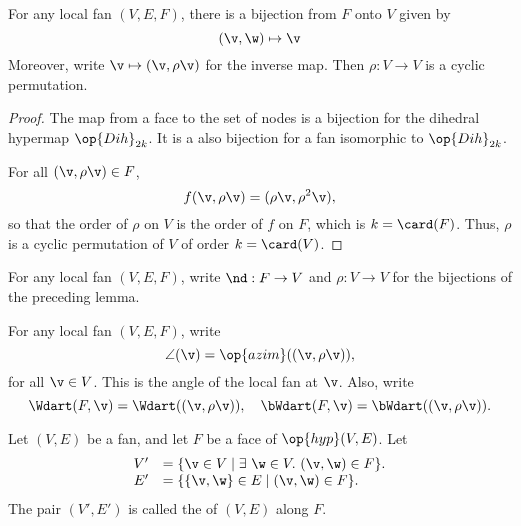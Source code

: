 
\begin{lemma}[]  
For any local fan $(V,E,F)$, there is a bijection from $F$ onto $V$
given by
\begin{displaymath}
(\v,\w) \mapsto \v
\end{displaymath}
Moreover, write $\v\mapsto(\v,\rho\v)$ for the inverse map. 
Then $\rho:V\to V$ is a cyclic permutation.
\end{lemma}
%

\begin{proof} The map from a face to the set of nodes is a bijection
for the dihedral hypermap $\op{Dih}_{2k}$. It is a also bijection for a fan isomorphic
to $\op{Dih}_{2k}$.

For all $(\v,\rho \v)\in F$,
\begin{displaymath}
f(\v,\rho \v) = (\rho\v,\rho^2\v),
\end{displaymath}
so that the order of $\rho$ on $V$ is the order of $f$ on $F$, which
is $k=\card(F)$.  Thus, $\rho$ is a cyclic permutation of $V$ of order
$k=\card(V)$.
\end{proof}

\begin{definition}[$\rho$,~$\v$] 
For any local fan $(V,E,F)$, write
$\nd:F\to V$ and $\rho:V\to V$ for the bijections of the preceding
lemma.
\end{definition}
%
%

\begin{definition}
For any local fan $(V,E,F)$,
write
\begin{displaymath}
\angle(\v) = \op{azim}((\v,\rho\v)),
\end{displaymath}
for all $\v\in V$.  This is the  angle of the local
fan at $\v$.  Also, write
\begin{displaymath}
  \Wdart(F,\v) = \Wdart((\v,\rho \v)),\quad 
\bWdart(F,\v) =\bWdart((\v,\rho \v)).
\end{displaymath}
%
%
%
\end{definition}


\begin{definition}[localization]
 Let $(V,E)$ be a fan, and let $F$ be
a face of $\op{hyp}(V,E)$.  Let
\begin{displaymath}
\begin{array}{rll}
V' &= \{\v\in V \mid \exists~\w\in V.~(\v,\w)\in F\}.\\
E' &= \{\{\v,\w\} \in E\mid (\v,\w)\in F\}.
\end{array}
\end{displaymath}
The pair $(V',E')$ is called the  of $(V,E)$
along $F$.
\end{definition}
%


